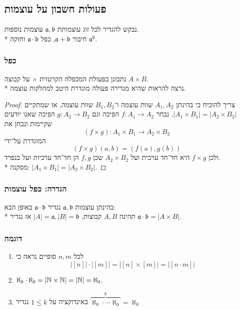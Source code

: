 \subsection{פעולות חשבון על עוצמות}
נבקש להגדיר לכל זוג עוצמותת $\mathfrak{a}, \mathfrak{b}$ עוצמות נוספות. \\*
חיבור $\mathfrak{a} + \mathfrak{b}$, כפל $\mathfrak{a} \cdot \mathfrak{b}$ וחזקה $\mathfrak{a}^\mathfrak{b}$.

\subsubsection{כפל}
נתבונן בפעולת המכפלה הקרטזית $\times$ על קבוצה $A \times B$. \\*
נרצה להראות שהיא מגדירה פעולה מוגדרת היטב למחלקות עוצמה.
\begin{proof}
	צריך להוכיח כי בהינתן $A_1, A_2$ שוות עוצמה ו־$B_1, B_2$ שוות עוצמה, אז שמתקיים $|A_1 \times B_1| = |A_2 \times B_2|$.
	נבחר $f : A_1 \to A_2$ הפיכה וגם $g : A_2 \to B_2$ הפיכה שאנו יודעים שקיימות ונבחן את
	\[
		(f \times g) : A_1 \times B_1 \to A_2 \times B_2
	\]
	המוגדרת על־ידי
	\[
		(f \times g)(a, b) = (f(a), g(b))
	\]
	ולכן $f \times g$ היא חד־חד ערכית ועל $A_2 \times B_2$ שכן $f, g$ הן חד־חד ערכיות ועל בנפרד. \\*
	מסקנה: $|A_1 \times B_1| = |A_2 \times B_2|$.
\end{proof}

\subsubsection{הגדרה: כפל עוצמות}
בהינתן עוצמות $\mathfrak{a}, \mathfrak{b}$ נגדיר $\mathfrak{a} \cdot \mathfrak{b}$ באופן הבא: \\*
תהינה $A, B$ קבוצות, $|A| = \mathfrak{a}, |B| = \mathfrak{b}$ אז נגדיר $\mathfrak{a} \cdot \mathfrak{b} = |A \times B|$.

\subsubsection{דוגמה}
\begin{enumerate}
	\item לכל $n, m$ סופיים נראה כי
		\[
			|[n]| \cdot |[m]| = |[n] \times [m]| = |[n \cdot m]|
		\]
	\item $\aleph_0 \cdot \aleph_0 = | \mathbb{N} \times \mathbb{N}| = |\mathbb{N}| = \aleph_0$.
	\item באינדוקציה על $1 \le k$ נגדיר $\overbrace{\aleph_0 \cdot \cdots \aleph_0}^k = \aleph_0$
\end{enumerate}

